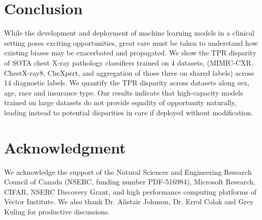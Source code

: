 \documentclass{ws-procs11x85}
\begin{document}
\section{Conclusion}
\label{sec:Conclusion}
While the development and deployment of machine learning models in a clinical setting poses exciting opportunities, great care must be taken to understand how existing biases may be exacerbated and propagated. We show the TPR disparity of SOTA chest X-ray pathology classifiers trained on 4 datasets, (MIMIC-CXR, ChestX-ray8, CheXpert, and aggregation of those three on shared labels) across 14 diagnostic labels. We quantify the TPR disparity across datasets along sex, age, race and insurance type. Our results indicate that high-capacity models trained on large datasets do not provide equality of opportunity naturally, leading instead to potential disparities in care if deployed without modification. 









\section*{Acknowledgment}
We acknowledge the support of the Natural Sciences and Engineering Research Council of Canada (NSERC, funding number PDF-516984), Microsoft Research, CIFAR, NSERC Discovery Grant, and high performance computing platforms of Vector Institute. We also thank Dr. Alistair Johnson, Dr. Errol Colak  and  Grey Kuling for productive discussions. 






\newpage
{}


\label{Appendix bias}
\end{document}
